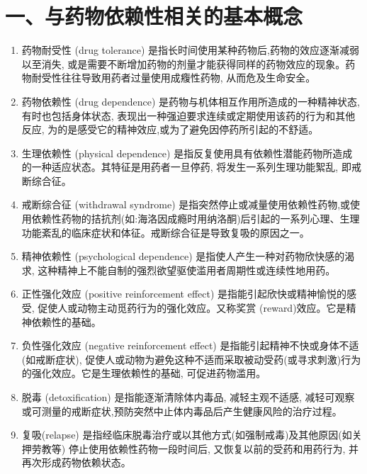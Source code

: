 \documentclass[10pt]{article}
\begin{document}
\section*{一、与药物依赖性相关的基本概念}
\begin{enumerate}
  \item 药物耐受性 (drug tolerance) 是指长时间使用某种药物后,药物的效应逐渐减弱以至消失, 或是需要不断增加药物的剂量才能获得同样的药物效应的现象。药物耐受性往往导致用药者过量使用成癁性药物, 从而危及生命安全。

  \item 药物依赖性 (drug dependence) 是药物与机体相互作用所造成的一种精神状态, 有时也包括身体状态, 表现出一种强迫要求连续或定期使用该药的行为和其他反应, 为的是感受它的精神效应,或为了避免因停药所引起的不舒适。

  \item 生理依赖性 (physical dependence) 是指反复使用具有依赖性潜能药物所造成的一种适应状态。其特征是用药者一旦停药, 将发生一系列生理功能絮乱, 即戒断综合征。

  \item 戒断综合征 (withdrawal syndrome) 是指突然停止或减量使用依赖性药物,或使用依赖性药物的拮抗剂(如:海洛因成瘾时用纳洛酮)后引起的一系列心理、生理功能紊乱的临床症状和体征。戒断综合征是导致复吸的原因之一。

  \item 精神依赖性 (psychological dependence) 是指使人产生一种对药物欣快感的渴求, 这种精神上不能自制的强烈欲望驱使滥用者周期性或连续性地用药。

  \item 正性强化效应 (positive reinforcement effect) 是指能引起欣快或精神愉悦的感受, 促使人或动物主动觅药行为的强化效应。又称奖赏 (reward)效应。它是精神依赖性的基础。

  \item 负性强化效应 (negative reinforcement effect) 是指能引起精神不快或身体不适(如戒断症状), 促使人或动物为避免这种不适而采取被动受药(或寻求刺激)行为的强化效应。它是生理依赖性的基础, 可促进药物滥用。

  \item 脱毒 (detoxification) 是指能逐渐清除体内毒品, 减轻主观不适感, 减轻可观察或可测量的戒断症状,预防突然中止体内毒品后产生健康风险的治疗过程。

  \item 复吸(relapse) 是指经临床脱毒治疗或以其他方式(如强制戒毒)及其他原因(如关押劳教等) 停止使用依赖性药物一段时间后, 又恢复以前的受药和用药行为, 并再次形成药物依赖状态。

\end{enumerate}
\end{document}

